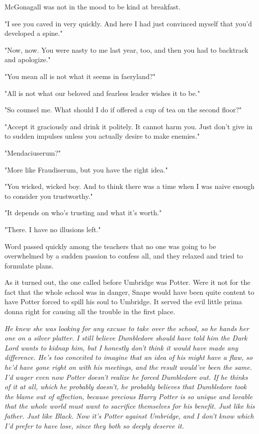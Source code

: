 \documentclass[a4paper,11pt]{article}
\begin{document}
McGonagall was not in the mood to be kind at breakfast.

"I see you caved in very quickly. And here I had just convinced myself that you'd developed a spine."

"Now, now. You were nasty to me last year, too, and then you had to backtrack and apologize."

"You mean all is not what it seems in faeryland?"

"All is not what our beloved and fearless leader wishes it to be."

"So counsel me. What should I do if offered a cup of tea on the second floor?"

"Accept it graciously and drink it politely. It cannot harm you. Just don't give in to sudden impulses unless you actually desire to make enemies."

"Mendaciuserum?"

"More like Fraudiserum, but you have the right idea."

"You wicked, wicked boy. And to think there was a time when I was naive enough to consider you trustworthy."

"It depends on who's trusting and what it's worth."

"There. I have no illusions left."

Word passed quickly among the teachers that no one was going to be overwhelmed by a sudden passion to confess all, and they relaxed and tried to formulate plans.

As it turned out, the one called before Umbridge was Potter. Were it not for the fact that the whole school was in danger, Snape would have been quite content to have Potter forced to spill his soul to Umbridge. It served the evil little prima donna right for causing all the trouble in the first place.

\emph{He knew she was looking for any excuse to take over the school, so he hands her one on a silver platter. I still believe Dumbledore should have told him the Dark Lord wants to kidnap him, but I honestly don't think it would have made any difference. He's too conceited to imagine that an idea of his might have a flaw, so he'd have gone right on with his meetings, and the result would've been the same. I'd wager even now Potter doesn't realize he forced Dumbledore out. If he thinks of it at all, which he probably doesn't, he probably believes that Dumbledore took the blame out of affection, because precious Harry Potter is so unique and lovable that the whole world must want to sacrifice themselves for his benefit. Just like his father. Just like Black. Now it's Potter against Umbridge, and I don't know which I'd prefer to have lose, since they both so deeply deserve it.}
\end{document}
